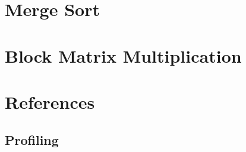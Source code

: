 
\section{Merge Sort}
\label{sec:locality-performance-merge-sort}


\section{Block Matrix Multiplication}
\label{sec:locality-performance-block-matrix-multiplication}


\section{References}

\subsection{Profiling}


